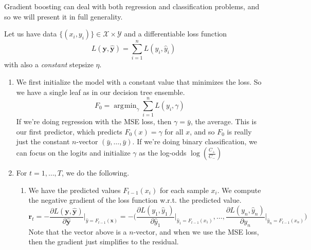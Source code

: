 \documentclass{article}
\DeclareMathOperator*{\argmin}{\arg\!\min}
\begin{document}
        Gradient boosting can deal with both regression and classification problems, and so we will present it in full generality. 

        \begin{definition}
          Let us have data $\{(x_i, y_i)\} \in \mathcal{X} \times \mathcal{Y}$ and a differentiable loss function 
          \begin{equation}
            L(\mathbf{y}, \hat{\mathbf{y}}) = \sum_{i=1}^n L(y_i, \hat{y}_i)
          \end{equation}
          with also a \textit{constant} stepsize $\eta$. 

          \begin{enumerate}
            \item We first initialize the model with a constant value that minimizes the loss. So we have a single leaf as in our decision tree ensemble. 
              \begin{equation}
                F_0 = \argmin_\gamma \sum_{i=1}^n L(y_i, \gamma)
              \end{equation}
              If we're doing regression with the MSE loss, then $\gamma = \bar{y}$, the average. This is our first predictor, which predicts $F_0 (x) = \gamma$ for all $x$, and so $F_0$ is really just the constant $n$-vector $(\bar{y}, \ldots, \bar{y})$. If we're doing binary classification, we can focus on the logits and initialize $\gamma$ as the log-odds $\log(\frac{C_+}{C_{-}})$

            \item For $t = 1, \ldots, T$, we do the following. 
              \begin{enumerate}
                \item We have the predicted values $F_{t-1}(x_i)$ for each sample $x_i$. We compute the negative gradient of the loss function w.r.t. the predicted value.
                  \begin{equation}
                    \mathbf{r}_t = - \frac{\partial L(\mathbf{y}, \hat{\mathbf{y}})}{\partial \hat{\mathbf{y}}} \bigg|_{\hat{y} = F_{t-1} (\mathbf{x})} = - \bigg( \frac{\partial L(y_1, \hat{y}_1)}{\partial \hat{y}_1} \bigg|_{\hat{y}_1 = F_{t-1} (x_1)}, \ldots, \frac{\partial L(y_n, \hat{y}_n)}{\partial y_n} \bigg|_{\hat{y}_n = F_{t-1}(x_n)} \bigg)
                  \end{equation}
                  Note that the vector above is a $n$-vector, and when we use the MSE loss, then the gradient just simplifies to the residual.  


\end{enumerate}
\end{enumerate}
\end{definition}
\end{document}
